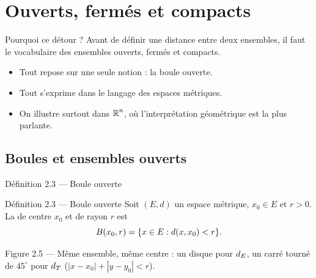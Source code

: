 \section{Ouverts, fermés et compacts}

\begin{frame}{Pourquoi ce détour ?}
  \small Avant de définir une distance entre deux ensembles, il
  faut le vocabulaire des ensembles ouverts, fermés et
  compacts.
  \begin{itemize}
    \item Tout repose sur une seule notion : la boule ouverte.
    \item Tout s'exprime dans le langage des espaces métriques.
    \item On illustre surtout dans $\operatorname{\mathbb{R}}^n$, où l'interprétation
      géométrique est la plus parlante.
  \end{itemize}
\end{frame}

\subsection{Boules et ensembles ouverts}

\begin{frame}{Définition 2.3 --- Boule ouverte}
  \begin{Enonce}{Définition 2.3 --- Boule ouverte}
    Soit $(E,d)$ un espace métrique, $x_0\in E$ et $r>0$. La  de centre $x_0$ et de rayon $r$ est
    \[
      B(x_0, r) = \{x\in E : d(x,x_0) < r\}.
    \]
  \end{Enonce}
  \begin{center}\scriptsize Figure 2.5 --- Même ensemble, même centre :
  un disque pour $d_E$, un carré tourné de $45^\circ$ pour $d_T$
  ($|x-x_0|+|y-y_0|<r$).\end{center}
\end{frame}

